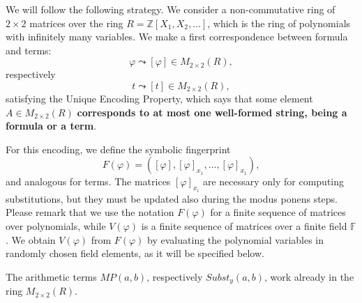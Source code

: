 \documentclass{article}
\theoremstyle{plain}
\theoremstyle{definition}
\begin{document}
We will follow the following strategy. We consider a non-commutative ring of $2 \times 2$ matrices over the ring $R = \mathbb Z[X_1, X_2, \dots]$, which is the ring of polynomials with infinitely many variables. We make a first correspondence between formula and terms:
$$\varphi \leadsto [\varphi] \in M_{2 \times 2}(R),$$
respectively
$$t \leadsto [t] \in M_{2 \times 2}(R),$$
satisfying the Unique Encoding Property, which says that some element $A \in M_{2 \times 2}(R)$ {\bf corresponds to at most one well-formed string, being a formula or a term}. 

For this encoding, we define the symbolic fingerprint $$F(\varphi) = ([\varphi], [\varphi]_{x_1}, \dots, [\varphi]_{x_1}),$$
and analogous for terms. The matrices $[\varphi]_{x_i}$ are necessary only for computing substitutions, but they must be updated also during the modus ponens steps.  Please remark that we use the notation $F(\varphi)$ for a finite sequence of matrices over polynomials, while $V(\varphi)$ is a finite sequence of matrices over a finite field $\mathbb F$. We obtain $V(\varphi)$ from $F(\varphi)$ by evaluating the polynomial variables in randomly chosen field elements, as it will be specified below. 

The arithmetic terms $MP(a, b)$, respectively $Subst_y(a, b)$, work already in the ring $M_{2 \times 2}(R)$. 
\end{document}

